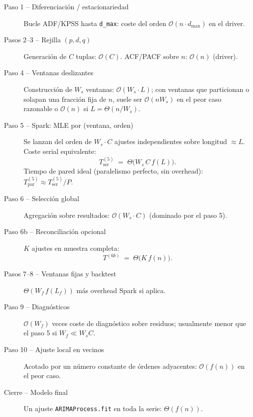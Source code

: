 \documentclass[11pt,a4paper]{article}
\begin{document}
\begin{description}
  \item[Paso 1 -- Diferenciación / estacionariedad]
  Bucle ADF/KPSS hasta \texttt{d\_max}: coste del orden
  $\mathcal{O}(n \cdot d_{\max})$ en el driver.

  \item[Pasos 2--3 -- Rejilla $(p,d,q)$]
  Generación de $C$ tuplas: $\mathcal{O}(C)$. ACF/PACF sobre $n$:
  $\mathcal{O}(n)$ (driver).

  \item[Paso 4 -- Ventanas deslizantes]
  Construcción de $W_s$ ventanas: $\mathcal{O}(W_s \cdot L)$; con ventanas que
  particionan o solapan una fracción fija de $n$, suele ser $\mathcal{O}(n W_s)$
  en el peor caso razonable o $\mathcal{O}(n)$ si $L=\Theta(n/W_s)$.

  \item[Paso 5 -- Spark: MLE por (ventana, orden)]
  Se lanzan del orden de $W_s \cdot C$ ajustes independientes sobre longitud
  $\approx L$. Coste serial equivalente:
  \begin{equation}
    T^{(5)}_{\mathrm{ser}} \;=\; \Theta\!\big(W_s\, C\, f(L)\big) .
  \end{equation}
  Tiempo de pared ideal (paralelismo perfecto, sin overhead):
  $T^{(5)}_{\mathrm{par}} \approx T^{(5)}_{\mathrm{ser}} / P$.

  \item[Paso 6 -- Selección global]
  Agregación sobre resultados: $\mathcal{O}(W_s \cdot C)$ (dominado por el paso 5).

  \item[Paso 6b -- Reconciliación opcional]
  $K$ ajustes en muestra completa:
  \begin{equation}
    T^{(6b)} \;=\; \Theta\!\big(K\, f(n)\big) .
  \end{equation}

  \item[Pasos 7--8 -- Ventanas fijas y backtest]
  $\Theta(W_f\, f(L_f))$ más overhead Spark si aplica.

  \item[Paso 9 -- Diagnósticos]
  $\mathcal{O}(W_f)$ veces coste de diagnóstico sobre residuos; usualmente menor
  que el paso 5 si $W_f \ll W_s C$.

  \item[Paso 10 -- Ajuste local en vecinos]
  Acotado por un número constante de órdenes adyacentes: $\mathcal{O}(f(n))$ en el
  peor caso.

  \item[Cierre -- Modelo final]
  Un ajuste \texttt{ARIMAProcess.fit} en toda la serie:
  $\Theta(f(n))$.
\end{description}
\end{document}
